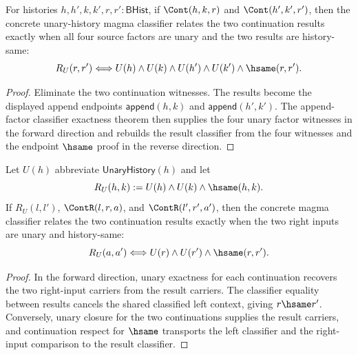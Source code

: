 \begin{theorem}
\label{thm:concrete-unary-history-magma-cont-result-classifier-factors}
For histories $h,h',k,k',r,r':\mathsf{BHist}$, if
$\Cont(h,k,r)$ and $\Cont(h',k',r')$, then the concrete unary-history magma
classifier relates the two continuation results exactly when all four source
factors are unary and the two results are history-same:
$$
R_U(r,r')
\Longleftrightarrow
U(h)\land U(k)\land U(h')\land U(k')\land\hsame(r,r').
$$
\end{theorem}
\begin{proof}
Eliminate the two continuation witnesses. The results become the displayed
append endpoints $\mathsf{append}(h,k)$ and $\mathsf{append}(h',k')$. The
append-factor classifier exactness theorem then supplies the four unary factor
witnesses in the forward direction and rebuilds the result classifier from the
four witnesses and the endpoint $\hsame$ proof in the reverse direction.
\end{proof}

\begin{theorem}
\label{thm:concrete-unary-history-magma-cont-left-context-classifier}
Let $U(h)$ abbreviate $\mathsf{UnaryHistory}(h)$ and let
$$
R_U(h,k):=U(h)\land U(k)\land\hsame(h,k).
$$
If $R_U(l,l')$, $\ContR(l,r,a)$, and $\ContR(l',r',a')$, then the concrete
magma classifier relates the two continuation results exactly when the two
right inputs are unary and history-same:
$$
R_U(a,a')
\Longleftrightarrow
U(r)\land U(r')\land\hsame(r,r').
$$
\end{theorem}
\begin{proof}
In the forward direction, unary exactness for each continuation recovers the
two right-input carriers from the result carriers. The classifier equality
between results cancels the shared classified left context, giving
$r\hsame r'$. Conversely, unary closure for the two continuations supplies the
result carriers, and continuation respect for $\hsame$ transports the left
classifier and the right-input comparison to the result classifier.
\end{proof}

